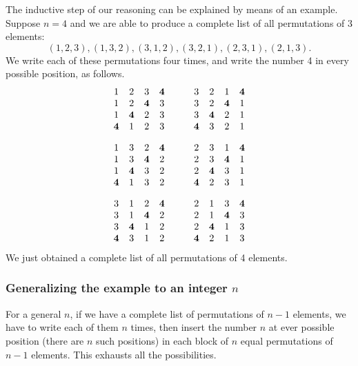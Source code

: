 \documentclass[a4paper]{book}
\theoremstyle{changebreak}                %
\begin{document}
The inductive step of our reasoning can be explained by means of
an example. Suppose $n=4$ and we are able to produce a complete list
of all permutations of 3 elements:
\begin{equation*}
  (1,2,3), (1,3,2), (3,1,2), (3,2,1), (2,3,1), (2,1,3).
\end{equation*}
We write each of these permutations four times, and write the number 4
in every possible position, as follows.
\begin{equation*}
\begin{array}{cccc}
1 & 2 & 3 & {\bf 4} \\ 
1 & 2 & {\bf 4} & 3 \\ 
1 & {\bf 4} & 2 & 3 \\ 
{\bf 4} & 1 & 2 & 3 \\ [1em]
1 & 3 & 2 & {\bf 4} \\ 
1 & 3 & {\bf 4} & 2 \\ 
1 & {\bf 4} & 3 & 2 \\ 
{\bf 4} & 1 & 3 & 2 \\ [1em]
3 & 1 & 2 & {\bf 4} \\ 
3 & 1 & {\bf 4} & 2 \\ 
3 & {\bf 4} & 1 & 2 \\ 
{\bf 4} & 3 & 1 & 2 
\end{array}
\quad \quad
\begin{array}{cccc}
3 & 2 & 1 & {\bf 4} \\ 
3 & 2 & {\bf 4} & 1 \\ 
3 & {\bf 4} & 2 & 1 \\ 
{\bf 4} & 3 & 2 & 1 \\ [1em] 
2 & 3 & 1 & {\bf 4} \\ 
2 & 3 & {\bf 4} & 1 \\ 
2 & {\bf 4} & 3 & 1 \\ 
{\bf 4} & 2 & 3 & 1 \\ [1em] 
2 & 1 & 3 & {\bf 4} \\ 
2 & 1 & {\bf 4} & 3 \\ 
2 & {\bf 4} & 1 & 3 \\ 
{\bf 4} & 2 & 1 & 3 
\end{array}
\end{equation*}
We just obtained a complete list of all permutations of 4 elements.

\subsubsection{Generalizing the example to an integer $n$}
For a general $n$, if we have a complete list of permutations of $n-1$
elements, we have to write each of them $n$ times, then insert the
number $n$ at ever possible position (there are $n$ such positions) in
each block of $n$ equal permutations of $n-1$ elements. This exhausts
all the possibilities.
\end{document}
